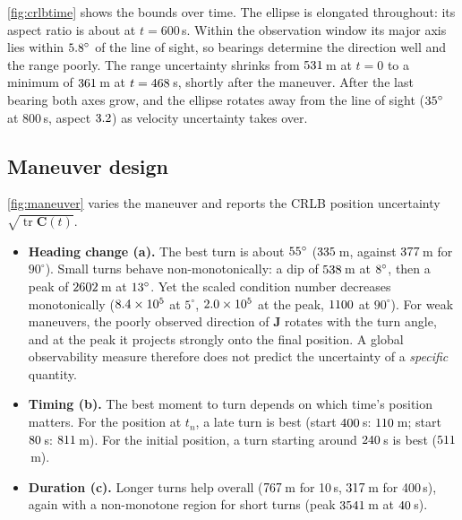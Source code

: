 \documentclass[11pt,a4paper]{article}
\newcommand{\J}{\bm{J}}
\newcommand{\Cm}{\bm{C}}
\DeclareMathOperator{\tr}{tr}
\theoremstyle{plain}
\theoremstyle{remark}
\begin{document}
\cref{fig:crlbtime} shows the bounds over time. The ellipse is elongated
throughout: its aspect ratio is about \aspectAtEnd{} at $t=600$\,s. Within the
observation window its major axis lies within $5.8^\circ$ of the
line of sight, so bearings determine the direction well and the range
poorly. The range uncertainty shrinks from $531$\,m at $t=0$ to a
minimum of $361$\,m at $t=468$\,s, shortly after the maneuver.
After the last bearing both axes grow, and the ellipse rotates away from the
line of sight ($35^\circ$ at 800\,s, aspect $3.2$)
as velocity uncertainty takes over.

\subsection{Maneuver design}
\label{sec:exp-maneuver}

\cref{fig:maneuver} varies the maneuver and reports the CRLB position
uncertainty $\sqrt{\tr\Cm(t)}$.

\begin{itemize}[nosep]
\item \textbf{Heading change (a).} The best turn is about
      $55^\circ$ ($335$\,m, against $377$\,m for
      $90^\circ$). Small turns behave non-monotonically: a dip of
      $538$\,m at $8^\circ$, then a peak of $2602$\,m
      at $13^\circ$. Yet the scaled condition number decreases
      monotonically ($8.4\times10^{5}$ at $5^\circ$, $2.0\times10^{5}$ at the peak,
      $1100$ at $90^\circ$). For weak maneuvers, the poorly observed
      direction of $\J$ rotates with the turn angle, and at the peak it
      projects strongly onto the final position. A global observability
      measure therefore does not predict the uncertainty of a \emph{specific}
      quantity.
\item \textbf{Timing (b).} The best moment to turn depends on which time's
      position matters. For the position at $t_n$, a late turn is best
      (start $400$\,s: $110$\,m; start $80$\,s:
      $811$\,m). For the initial position, a turn starting around
      $240$\,s is best ($511$\,m).
\item \textbf{Duration (c).} Longer turns help overall ($767$\,m for
      10\,s, $317$\,m for 400\,s), again with a non-monotone region
      for short turns (peak $3541$\,m at $40$\,s).
\end{itemize}
\end{document}
